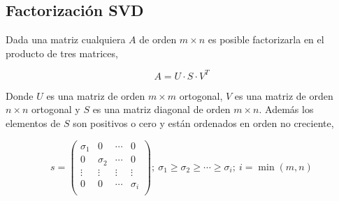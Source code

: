 \begin{paracol}{2}
\subsection{Factorización SVD}\label{sec:SVD}
Dada una matriz cualquiera $A$ de orden $m\times n$ es posible factorizarla en el producto de tres matrices,
\end{paracol}
\begin{equation*}
A=U\cdot S \cdot V^T 
\end{equation*}
\begin{paracol}{2}
Donde $U$ es una matriz de orden $m\times m$ ortogonal, $V$ es una matriz de orden $n\times n$ ortogonal y $S$ es una matriz diagonal de orden $m\times n$. Además los elementos de $S$ son positivos o cero y están ordenados en orden no creciente,
\end{paracol}
\begin{equation*}
s=\begin{pmatrix}
\sigma_1& 0& \cdots & 0\\
0 & \sigma_2& \cdots & 0\\
\vdots & \vdots & \vdots & \vdots \\
0& 0& \cdots & \sigma_i\\ 
\end{pmatrix}; \ \sigma_1 \geq \sigma_2 \geq \cdots \geq \sigma_i; \ i=\min(m,n)
\end{equation*}

